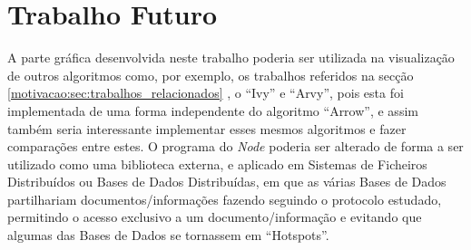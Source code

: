 \section{Trabalho Futuro}
\label{sec:trab-futuro}
A parte gráfica desenvolvida neste trabalho poderia ser utilizada na visualização de outros algoritmos como,
por exemplo, os trabalhos referidos na secção \ref{motivacao:sec:trabalhos_relacionados}
, o ``Ivy'' e ``Arvy'', pois esta foi implementada de uma forma independente do algoritmo ``Arrow'',
e assim também seria interessante implementar esses mesmos algoritmos e fazer comparações entre estes.
O programa do \emph{Node} poderia ser alterado de forma a ser utilizado como uma biblioteca externa,
e aplicado em Sistemas de Ficheiros Distribuídos ou Bases de Dados Distribuídas,
em que as várias Bases de Dados partilhariam documentos/informações fazendo seguindo o protocolo estudado,
permitindo o acesso exclusivo a um documento/informação e evitando que algumas das Bases de Dados se tornassem em ``Hotspots''.


